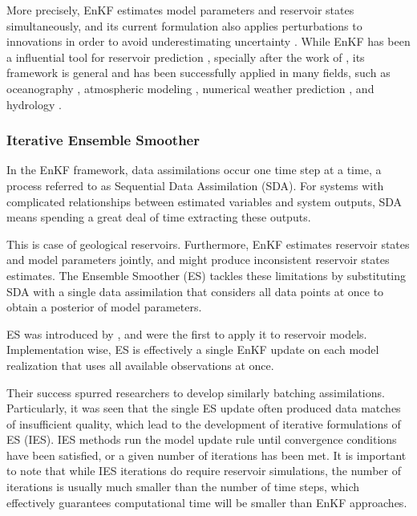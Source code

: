 More precisely, EnKF estimates model parameters and reservoir states simultaneously, 
and its current formulation also applies perturbations to innovations in order to avoid underestimating uncertainty 
\cite{Burgers:1998,Houtekamer:1998}.
%
While EnKF has been a influential tool for reservoir prediction \cite{Aanonsen:2009, Oliver:2011}, 
specially after the work of ,
its framework is general and has been successfully applied in many fields, such as
oceanography \cite{Bertino:2003, Keppenne:2003}, 
atmospheric modeling \cite{Whitaker:2008,Houtekamer:2016},
numerical weather prediction \cite{Houtekamer:2005:Monthly,Houtekamer:2005:Quaterly,Szunyogh:2005,Otsuka:2016}, 
and hydrology \cite{Reichle:2002, Chen:2006, Liu:2008, Sun:2016}.

\subsubsection{Iterative Ensemble Smoother}

In the EnKF framework, data assimilations occur one time step at a time,
a process referred to as Sequential Data Assimilation (SDA).
%
For systems with complicated relationships between estimated variables and system outputs,
SDA means spending a great deal of time extracting these outputs.

This is case of geological reservoirs.
Furthermore, EnKF estimates reservoir states and model parameters jointly,
and might produce inconsistent reservoir states estimates.
% 
The Ensemble Smoother (ES) tackles these limitations by substituting SDA 
with a single data assimilation that considers all data points at once to obtain a posterior of model parameters.

ES was introduced by , 
and  were the first to apply it to reservoir models.
Implementation wise, ES is effectively a single EnKF update on each model realization 
that uses all available observations at once.

Their success spurred researchers to develop similarly batching assimilations.
Particularly, it was seen that the single ES update often produced data matches of insufficient quality,
which lead to the development of iterative formulations of ES (IES).
%
IES methods run the model update rule until convergence conditions have been satisfied, 
or a given number of iterations has been met.
%
It is important to note that while IES iterations do require reservoir simulations, 
the number of iterations is usually much smaller than the number of time steps,
which effectively guarantees computational time will be smaller than EnKF approaches.

